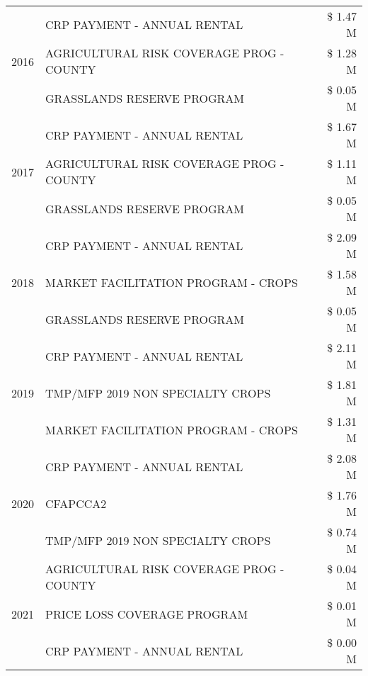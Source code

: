 \begin{tabular}{llr}
\cline{1-3}
\multirow[t]{3}{*}{2016} & CRP PAYMENT - ANNUAL RENTAL                   & \$ 1.47 M \\
 & AGRICULTURAL RISK COVERAGE PROG - COUNTY      & \$ 1.28 M \\
 & GRASSLANDS RESERVE PROGRAM                    & \$ 0.05 M \\
\cline{1-3}
\multirow[t]{3}{*}{2017} & CRP PAYMENT - ANNUAL RENTAL & \$ 1.67 M \\
 & AGRICULTURAL RISK COVERAGE PROG - COUNTY & \$ 1.11 M \\
 & GRASSLANDS RESERVE PROGRAM & \$ 0.05 M \\
\cline{1-3}
\multirow[t]{3}{*}{2018} & CRP PAYMENT - ANNUAL RENTAL & \$ 2.09 M \\
 & MARKET FACILITATION PROGRAM - CROPS & \$ 1.58 M \\
 & GRASSLANDS RESERVE PROGRAM & \$ 0.05 M \\
\cline{1-3}
\multirow[t]{3}{*}{2019} & CRP PAYMENT - ANNUAL RENTAL & \$ 2.11 M \\
 & TMP/MFP 2019 NON SPECIALTY CROPS & \$ 1.81 M \\
 & MARKET FACILITATION PROGRAM - CROPS & \$ 1.31 M \\
\cline{1-3}
\multirow[t]{3}{*}{2020} & CRP PAYMENT - ANNUAL RENTAL & \$ 2.08 M \\
 & CFAPCCA2 & \$ 1.76 M \\
 & TMP/MFP 2019 NON SPECIALTY CROPS & \$ 0.74 M \\
\cline{1-3}
\multirow[t]{3}{*}{2021} & AGRICULTURAL RISK COVERAGE PROG - COUNTY & \$ 0.04 M \\
 & PRICE LOSS COVERAGE PROGRAM & \$ 0.01 M \\
 & CRP PAYMENT - ANNUAL RENTAL & \$ 0.00 M \\
\cline{1-3}
\bottomrule
\end{tabular}
